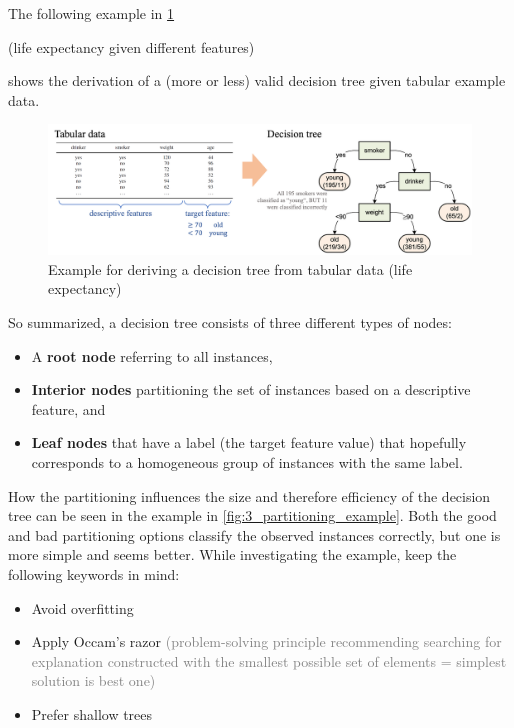 The following example in \ref{fig:3_smoke_tree_example} \begin{note}(life expectancy given different features)\end{note} shows the derivation of a (more or less) valid decision tree given tabular example data.

\begin{figure}[h]
  \centering
  \includegraphics[width=\textwidth]{assets/trees/basics/tab_to_tree.png}
  \caption{Example for deriving a decision tree from tabular data (life expectancy)}
  \label{fig:3_smoke_tree_example}
\end{figure}

So summarized, a decision tree consists of three different types of nodes:
\begin{itemize}
  \item A \textbf{root node} referring to all instances,
  \item \textbf{Interior nodes} partitioning the set of instances based on a descriptive feature, and
  \item \textbf{Leaf nodes} that have a label (the target feature value) that hopefully corresponds to a homogeneous group of instances with the same label.
\end{itemize}

How the partitioning influences the size and therefore efficiency of the decision tree can be seen in the example in \ref{fig:3_partitioning_example}. Both the good and bad partitioning options classify the observed instances correctly, but one is more simple and seems better. While investigating the example, keep the following keywords in mind:
\begin{itemize}
  \item Avoid overfitting
  \item Apply Occam's razor \textcolor{gray}{\footnotesize (problem-solving principle recommending searching for explanation constructed with the smallest possible set of elements = simplest solution is best one)}
  \item Prefer shallow trees
\end{itemize}

